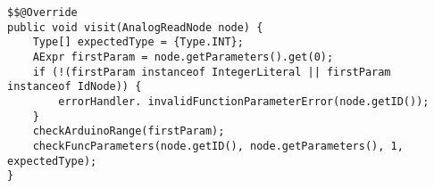 \begin{lstlisting}[caption={Visit method for AnalogReadNode in FuncStructureVisitor}, label={AnalogReadNode}]
$$@Override
public void visit(AnalogReadNode node) {
    Type[] expectedType = {Type.INT};
    AExpr firstParam = node.getParameters().get(0);
    if (!(firstParam instanceof IntegerLiteral || firstParam instanceof IdNode)) {
        errorHandler. invalidFunctionParameterError(node.getID());
    }
    checkArduinoRange(firstParam);
    checkFuncParameters(node.getID(), node.getParameters(), 1, expectedType);
}
\end{lstlisting}